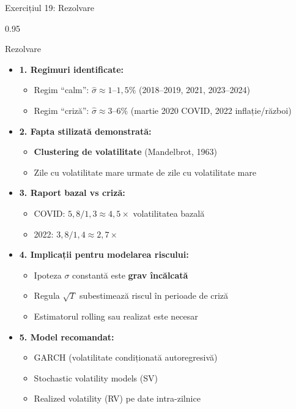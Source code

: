 \documentclass[9pt, aspectratio=169, t]{beamer}
\begin{document}
\begin{frame}[shrink=25]{Exercițiul 19: Rezolvare}
\begin{cminipage}{0.95\textwidth}
\begin{exampleblock}{Rezolvare}
\begin{itemize}\setlength{\itemsep}{0pt}
    \item \textbf{1. Regimuri identificate:}
    \begin{itemize}\setlength{\itemsep}{0pt}
        \item Regim ``calm'': $\hat\sigma \approx 1$--$1{,}5\%$ (2018--2019, 2021, 2023--2024)
        \item Regim ``criză'': $\hat\sigma \approx 3$--$6\%$ (martie 2020 COVID, 2022 inflație/război)
    \end{itemize}
    \item \textbf{2. Fapta stilizată demonstrată:}
    \begin{itemize}\setlength{\itemsep}{0pt}
        \item \textbf{Clustering de volatilitate} (Mandelbrot, 1963)
        \item Zile cu volatilitate mare urmate de zile cu volatilitate mare
    \end{itemize}
    \item \textbf{3. Raport bazal vs criză:}
    \begin{itemize}\setlength{\itemsep}{0pt}
        \item COVID: $5{,}8/1{,}3 \approx 4{,}5\times$ volatilitatea bazală
        \item 2022: $3{,}8/1{,}4 \approx 2{,}7\times$
    \end{itemize}
    \item \textbf{4. Implicații pentru modelarea riscului:}
    \begin{itemize}\setlength{\itemsep}{0pt}
        \item Ipoteza $\sigma$ constantă este \textbf{grav încălcată}
        \item Regula $\sqrt{T}$ subestimează riscul în perioade de criză
        \item Estimatorul rolling sau realizat este necesar
    \end{itemize}
    \item \textbf{5. Model recomandat:}
    \begin{itemize}\setlength{\itemsep}{0pt}
        \item GARCH (volatilitate condiționată autoregresivă)
        \item Stochastic volatility models (SV)
        \item Realized volatility (RV) pe date intra-zilnice
    \end{itemize}
\end{itemize}
\end{exampleblock}
\end{cminipage}
\end{frame}
\end{document}
